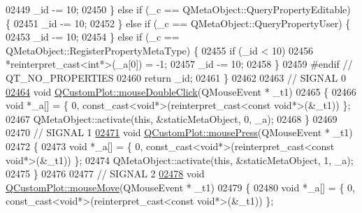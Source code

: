 \begin{DoxyCode}
02449         \_id -= 10;
02450     \} \textcolor{keywordflow}{else} \textcolor{keywordflow}{if} (\_c == QMetaObject::QueryPropertyEditable) \{
02451         \_id -= 10;
02452     \} \textcolor{keywordflow}{else} \textcolor{keywordflow}{if} (\_c == QMetaObject::QueryPropertyUser) \{
02453         \_id -= 10;
02454     \} \textcolor{keywordflow}{else} \textcolor{keywordflow}{if} (\_c == QMetaObject::RegisterPropertyMetaType) \{
02455         \textcolor{keywordflow}{if} (\_id < 10)
02456             *\textcolor{keyword}{reinterpret\_cast<}\textcolor{keywordtype}{int}*\textcolor{keyword}{>}(\_a[0]) = -1;
02457         \_id -= 10;
02458     \}
02459 \textcolor{preprocessor}{#endif // QT\_NO\_PROPERTIES}
02460     \textcolor{keywordflow}{return} \_id;
02461 \}
02462 
02463 \textcolor{comment}{// SIGNAL 0}
\hypertarget{a00067_source_l02464}{}\hyperlink{a00116_a9b232142c64fcf273a953ee08e5b90e9}{02464} \textcolor{keywordtype}{void} \hyperlink{a00116_a9b232142c64fcf273a953ee08e5b90e9}{QCustomPlot::mouseDoubleClick}(QMouseEvent * \_t1)
02465 \{
02466     \textcolor{keywordtype}{void} *\_a[] = \{ 0, \textcolor{keyword}{const\_cast<}\textcolor{keywordtype}{void}*\textcolor{keyword}{>}(\textcolor{keyword}{reinterpret\_cast<}\textcolor{keyword}{const }\textcolor{keywordtype}{void}*\textcolor{keyword}{>}(&\_t1)) \};
02467     QMetaObject::activate(\textcolor{keyword}{this}, &staticMetaObject, 0, \_a);
02468 \}
02469 
02470 \textcolor{comment}{// SIGNAL 1}
\hypertarget{a00067_source_l02471}{}\hyperlink{a00116_aca75bf9afb5dd19349c375de2a87a051}{02471} \textcolor{keywordtype}{void} \hyperlink{a00116_aca75bf9afb5dd19349c375de2a87a051}{QCustomPlot::mousePress}(QMouseEvent * \_t1)
02472 \{
02473     \textcolor{keywordtype}{void} *\_a[] = \{ 0, \textcolor{keyword}{const\_cast<}\textcolor{keywordtype}{void}*\textcolor{keyword}{>}(\textcolor{keyword}{reinterpret\_cast<}\textcolor{keyword}{const }\textcolor{keywordtype}{void}*\textcolor{keyword}{>}(&\_t1)) \};
02474     QMetaObject::activate(\textcolor{keyword}{this}, &staticMetaObject, 1, \_a);
02475 \}
02476 
02477 \textcolor{comment}{// SIGNAL 2}
\hypertarget{a00067_source_l02478}{}\hyperlink{a00116_a742ca4f94688bed2a685fd8a56ce5704}{02478} \textcolor{keywordtype}{void} \hyperlink{a00116_a742ca4f94688bed2a685fd8a56ce5704}{QCustomPlot::mouseMove}(QMouseEvent * \_t1)
02479 \{
02480     \textcolor{keywordtype}{void} *\_a[] = \{ 0, \textcolor{keyword}{const\_cast<}\textcolor{keywordtype}{void}*\textcolor{keyword}{>}(\textcolor{keyword}{reinterpret\_cast<}\textcolor{keyword}{const }\textcolor{keywordtype}{void}*\textcolor{keyword}{>}(&\_t1)) \};

\end{DoxyCode}
